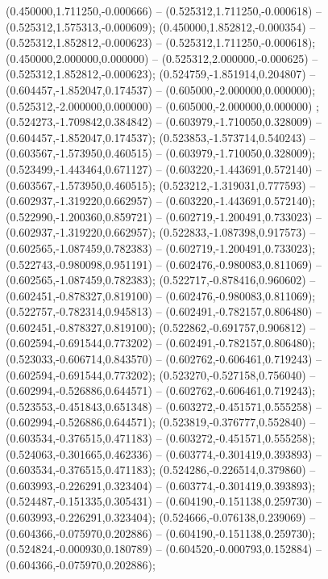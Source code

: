  (0.450000,1.711250,-0.000666) -- (0.525312,1.711250,-0.000618) -- (0.525312,1.575313,-0.000609);
 (0.450000,1.852812,-0.000354) -- (0.525312,1.852812,-0.000623) -- (0.525312,1.711250,-0.000618);
 (0.450000,2.000000,0.000000) -- (0.525312,2.000000,-0.000625) -- (0.525312,1.852812,-0.000623);
 (0.524759,-1.851914,0.204807) -- (0.604457,-1.852047,0.174537) -- (0.605000,-2.000000,0.000000);
 (0.525312,-2.000000,0.000000) -- (0.605000,-2.000000,0.000000) ;
 (0.524273,-1.709842,0.384842) -- (0.603979,-1.710050,0.328009) -- (0.604457,-1.852047,0.174537);
 (0.523853,-1.573714,0.540243) -- (0.603567,-1.573950,0.460515) -- (0.603979,-1.710050,0.328009);
 (0.523499,-1.443464,0.671127) -- (0.603220,-1.443691,0.572140) -- (0.603567,-1.573950,0.460515);
 (0.523212,-1.319031,0.777593) -- (0.602937,-1.319220,0.662957) -- (0.603220,-1.443691,0.572140);
 (0.522990,-1.200360,0.859721) -- (0.602719,-1.200491,0.733023) -- (0.602937,-1.319220,0.662957);
 (0.522833,-1.087398,0.917573) -- (0.602565,-1.087459,0.782383) -- (0.602719,-1.200491,0.733023);
 (0.522743,-0.980098,0.951191) -- (0.602476,-0.980083,0.811069) -- (0.602565,-1.087459,0.782383);
 (0.522717,-0.878416,0.960602) -- (0.602451,-0.878327,0.819100) -- (0.602476,-0.980083,0.811069);
 (0.522757,-0.782314,0.945813) -- (0.602491,-0.782157,0.806480) -- (0.602451,-0.878327,0.819100);
 (0.522862,-0.691757,0.906812) -- (0.602594,-0.691544,0.773202) -- (0.602491,-0.782157,0.806480);
 (0.523033,-0.606714,0.843570) -- (0.602762,-0.606461,0.719243) -- (0.602594,-0.691544,0.773202);
 (0.523270,-0.527158,0.756040) -- (0.602994,-0.526886,0.644571) -- (0.602762,-0.606461,0.719243);
 (0.523553,-0.451843,0.651348) -- (0.603272,-0.451571,0.555258) -- (0.602994,-0.526886,0.644571);
 (0.523819,-0.376777,0.552840) -- (0.603534,-0.376515,0.471183) -- (0.603272,-0.451571,0.555258);
 (0.524063,-0.301665,0.462336) -- (0.603774,-0.301419,0.393893) -- (0.603534,-0.376515,0.471183);
 (0.524286,-0.226514,0.379860) -- (0.603993,-0.226291,0.323404) -- (0.603774,-0.301419,0.393893);
 (0.524487,-0.151335,0.305431) -- (0.604190,-0.151138,0.259730) -- (0.603993,-0.226291,0.323404);
 (0.524666,-0.076138,0.239069) -- (0.604366,-0.075970,0.202886) -- (0.604190,-0.151138,0.259730);
 (0.524824,-0.000930,0.180789) -- (0.604520,-0.000793,0.152884) -- (0.604366,-0.075970,0.202886);

